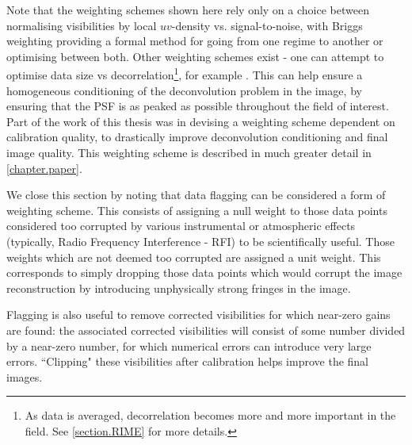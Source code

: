 \pg
Note that the weighting schemes shown here rely only on a choice between normalising visibilities by local $uv$-density vs. signal-to-noise, with Briggs weighting providing a formal method for going from one regime to another or optimising between both. Other weighting schemes exist - one can attempt to optimise data size vs decorrelation\footnote{As data is averaged, decorrelation becomes more and more important in the field. See \cref{section.RIME} for more details.}, for example . This can help ensure a homogeneous conditioning of the deconvolution problem in the image, by ensuring that the PSF is as peaked as possible throughout the field of interest. Part of the work of this thesis was in devising a weighting scheme dependent on calibration quality, to drastically improve deconvolution conditioning and final image quality. This weighting scheme is described in much greater detail in \cref{chapter.paper}.

\pg
We close this section by noting that data flagging  can be considered a form of weighting scheme. This consists of assigning a null weight to those data points considered too corrupted by various instrumental or atmospheric effects (typically, Radio Frequency Interference - RFI) to be scientifically useful. Those weights which are not deemed too corrupted are assigned a unit weight. This corresponds to simply dropping those data points which would corrupt the image reconstruction by introducing unphysically strong fringes in the image.

\pg
Flagging is also useful to remove corrected visibilities for which near-zero gains are found: the associated corrected visibilities will consist of some number divided by a near-zero number, for which numerical errors can introduce very large errors. ``Clipping" these visibilities after calibration helps improve the final images.